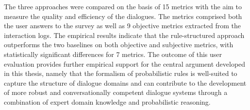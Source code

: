 The three approaches were compared on the basis of 15 metrics with the aim to measure the quality and efficiency of the dialogues. The metrics comprised both the user answers to the survey as well as 9 objective metrics extracted from the interaction logs.   The empirical results indicate that the rule-structured approach outperforms the two baselines on both objective and subjective metrics, with statistically significant differences for 7 metrics. The outcome of this user evaluation provides further empirical support for the central argument developed in this thesis, namely that the formalism of probabilistic rules is well-suited to capture the structure of dialogue domains and can contribute to the development of more robust and conversationally competent dialogue systems through a combination of expert domain knowledge and probabilistic reasoning. 


